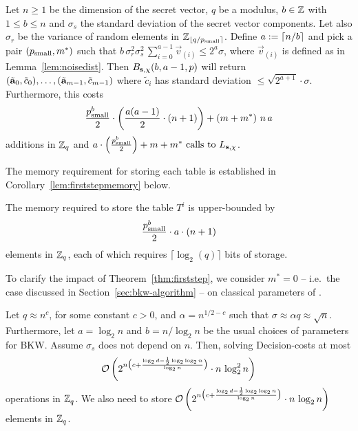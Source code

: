 \begin{theorem}
\label{thm:firststep}
Let $n\ge 1$ be the dimension of the \LWE{} secret vector, $q$ be a modulus, $b \in \mathbb{Z}$ with $1 \leq b \le n$ and $\sigma_s$ 
the standard deviation of the secret vector components. Let also $\sigma_r$ be the variance of random elements in $\mathbb{Z}_{\left\lfloor{q/p_{{\rm small}}}\right\rceil}$.
Define $a := \lceil n/b \rceil$ and pick a pair $(p_{{\rm small}},m^\ast)$ 
such that $b\, \sigma_r^2 \sigma_s^2\, \sum_{i=0}^{a-1} \vec{v}_{(i)} 
\leq 2^a\sigma$,  where $\vec{v}_{(i)}$ is defined as in Lemma~\ref{lem:noisedist}. Then $B_{\mathbf{s},\chi}(b,a-1,p)$ will return  
$(\tilde{\mathbf{a}}_0,\tilde c_0),\ldots,(\tilde{\mathbf{a}}_{m-1},\tilde c_{m-1})$  where  $\tilde c_i$ has standard deviation 
$\leq \sqrt{2^{a+1}}\cdot \sigma$. Furthermore, this costs
\begin{eqnarray*}
\frac{p_{{\rm small}}^b}{2}\cdot \left( \frac{a(a-1)}{2}\cdot (n+1) \right) + \left(m + m^\ast\right)\, n \, a
\end{eqnarray*}
additions in $\mathbb{Z}_q$ and $a\cdot \left(\frac{p_{{\rm small}}^b}{2}\right) + m + m^\ast \mbox{ calls to } L_{\mathbf{s},\chi}$.
\end{theorem}
The memory requirement for storing each table is established in Corollary~\ref{lem:firststepmemory} below.
\begin{corollary}
\label{lem:firststepmemory}
The memory required to store the table $T^i$ is upper-bounded by 
\begin{equation*}
\frac{p_{{\rm small}}^b}{2} \cdot a\cdot \left(n+1\right)
\end{equation*}
elements in $\mathbb{Z}_q$, each of which requires $\lceil\log_2(q)\rceil$ bits of storage.
\end{corollary}
To clarify the impact of Theorem~\ref{thm:firststep}, we consider $m^\ast=0$ -- i.e.\ the case discussed in Section~\ref{sec:bkw-algorithm} --
on classical parameters of \LWE{}.
\def\memcomplexity{\bigO{2^{n\big(c+\frac{\log_2 d-\frac 1 2 \log_2 \log_2 n}{\log_2 n}\big)}\cdot n \, \log_2 n}}
\begin{corollary}
Let $q \approx n^c$, for some constant $c>0$, and $\alpha = n^{1/2 - c}$ such that $\sigma \approx \alpha q \approx \sqrt{n}$.
Furthermore, let $a=\log_2 n$ and $b = n/\log_2 n$ be the usual choices of parameters for BKW. 
Assume $\sigma_s$ does not depend on $n$. Then, solving Decision-\LWE costs at most
\[
\mathcal{O}\left(2^{n\big(c+\frac{\log_2 d-\frac 1 2 \log_2 \log_2 n}{\log_2 n}\big)}\cdot n\, \log_2^2 n\right) 
\]
operations in $\mathbb{Z}_q$. We also need to store $\memcomplexity$ elements in $\mathbb{Z}_q$. 
\end{corollary}
